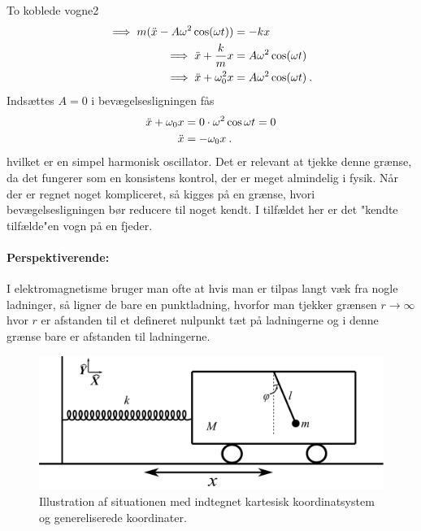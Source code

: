 \begin{opgave}{To koblede vogne}{2}
\begin{align*}
	\implies m(\ddot{x} - A\omega^2\cos(\omega t)) &= -kx \\
	\implies \ddot{x} + \frac{k}{m}x &= A\omega^2\cos(\omega t) \\\implies \ddot{x} + \omega_0^2x &= A\omega^2\cos(\omega t) \: .
\end{align*}
\opg Indsættes $A=0$ i bevægelsesligningen fås
\begin{align*}
	\ddot{x} + \omega_0x &= 0\cdot\omega^2\cos\omega t = 0 \\
	\ddot{x} &= -\omega_0x \: .
\end{align*}
hvilket er en simpel harmonisk oscillator.
\opg Det er relevant at tjekke denne grænse, da det fungerer som en konsistens kontrol, der er meget almindelig i fysik. Når der er regnet noget kompliceret, så kigges på en grænse, hvori bevægelsesligningen bør reducere til noget kendt. I tilfældet her er det "kendte tilfælde"\;en vogn på en fjeder. \\
\paragraph{Perspektiverende:} I elektromagnetisme bruger man ofte at hvis man er tilpas langt væk fra nogle ladninger, så ligner de bare en punktladning, hvorfor man tjekker grænsen $r\rightarrow\infty$ hvor $r$ er afstanden til et defineret nulpunkt tæt på ladningerne og i denne grænse bare er afstanden til ladningerne.
\end{opgave}
%
%
\begin{figure}[t]
\centering
\includegraphics[width=.6\columnwidth]{Analytisk-Mekanik/PendulIVogn.pdf}
\caption{Illustration af situationen med indtegnet kartesisk koordinatsystem og genereliserede koordinater.}
\label{fig:PendulIVogn}
\end{figure}
%
%
